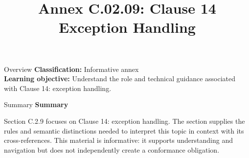 \documentclass[10pt,letterpaper]{article}
\title{Annex C.02.09: Clause 14 Exception Handling}
\author{}
\date{}
\begin{document}
\maketitle
\begin{CornellOverviewBox}{Overview}
\textbf{Classification:} Informative annex\\[2pt]
\textbf{Learning objective:} Understand the role and technical guidance associated with Clause 14: exception handling.
\end{CornellOverviewBox}\begin{CornellSummaryBox}{Summary}
{\sffamily\bfseries\color{Accent} Summary}\par\vspace{3pt}Section C.2.9 focuses on Clause 14: exception handling. The section supplies the rules and semantic distinctions needed to interpret this topic in context with its cross-references. This material is informative: it supports understanding and navigation but does not independently create a conformance obligation.
\end{CornellSummaryBox}
\end{document}
